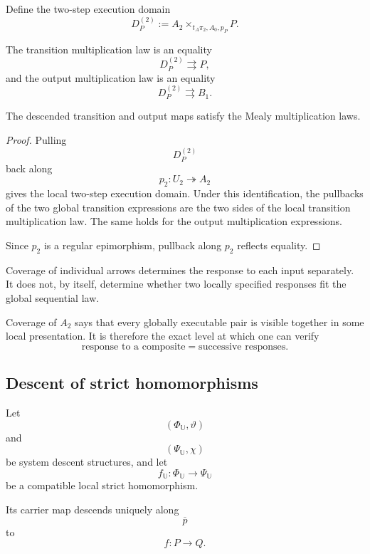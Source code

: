 Define the two-step execution domain
\[
    D_P^{(2)}
    :=
    A_2
    \times_{t_A\pi_2,A_0,p_P}
    P.
\]

The transition multiplication law is an equality
\[
    D_P^{(2)}
    \rightrightarrows
    P,
\]
and the output multiplication law is an equality
\[
    D_P^{(2)}
    \rightrightarrows
    B_1.
\]

\begin{proposition}
\label{prop:descent-multiplication-equations}
The descended transition and output maps satisfy the Mealy multiplication
laws.
\end{proposition}

\begin{proof}
Pulling
\[
    D_P^{(2)}
\]
back along
\[
    p_2:U_2\twoheadrightarrow A_2
\]
gives the local two-step execution domain. Under this identification, the
pullbacks of the two global transition expressions are the two sides of the
local transition multiplication law. The same holds for the output
multiplication expressions.

Since \(p_2\) is a regular epimorphism, pullback along \(p_2\) reflects
equality.
\end{proof}

\begin{remark}
\label{rem:why-composable-pairs-covered}
Coverage of individual arrows determines the response to each input
separately. It does not, by itself, determine whether two locally specified
responses fit the global sequential law.

Coverage of \(A_2\) says that every globally executable pair is visible
together in some local presentation. It is therefore the exact level at which
one can verify
\[
    \text{response to a composite}
    =
    \text{successive responses}.
\]
\end{remark}

\subsection{Descent of strict homomorphisms}
\label{subsec:descent-strict-homomorphisms}

Let
\[
    (\Phi_{\mathbb U},\vartheta)
\]
and
\[
    (\Psi_{\mathbb U},\chi)
\]
be system descent structures, and let
\[
    f_{\mathbb U}:
    \Phi_{\mathbb U}\to\Psi_{\mathbb U}
\]
be a compatible local strict homomorphism.

Its carrier map descends uniquely along
\[
    \overline p
\]
to
\[
    f:P\to Q.
\]

